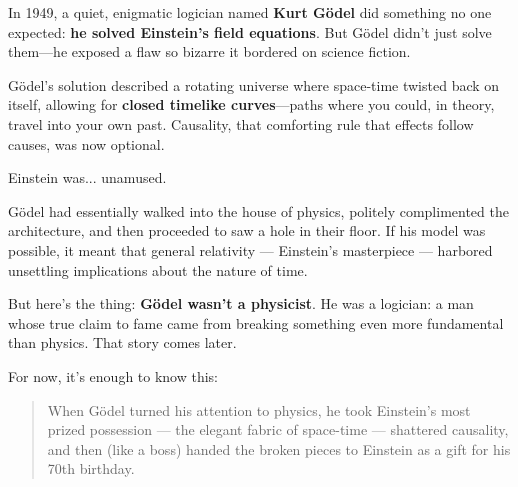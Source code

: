 \begin{tcolorbox}[colback=blue!5!white, colframe=blue!50!black,
  title={Historical Sidebar: The Logician Who Broke Physics}]
  
In 1949, a quiet, enigmatic logician named \textbf{Kurt Gödel} did something no one expected:  \textbf{he solved Einstein’s field equations}. But Gödel didn’t just solve them—he exposed a flaw so bizarre it bordered on science fiction.

\medskip

Gödel’s solution described a rotating universe where space-time twisted back on itself, allowing for \textbf{closed timelike curves}—paths where you could, in theory, travel into your own past. Causality, that comforting rule that effects follow causes, was now optional.

\medskip

Einstein was... unamused.

\medskip

Gödel had essentially walked into the house of physics, politely complimented the architecture, and then proceeded to saw a hole in their floor. If his model was possible, it meant that general relativity --- Einstein’s masterpiece --- harbored unsettling implications about the nature of time.

\medskip

But here’s the thing: \textbf{Gödel wasn’t a physicist}. He was a logician: a man whose true claim to fame came from breaking something even more fundamental than physics. That story comes later.  

\medskip

For now, it’s enough to know this:

\medskip

\begin{quote}
  When Gödel turned his attention to physics, he took Einstein’s most prized possession --- the elegant fabric of space-time --- shattered causality, and then (like a boss) handed the broken pieces to Einstein as a gift for his 70th birthday.
\end{quote}

\end{tcolorbox}

